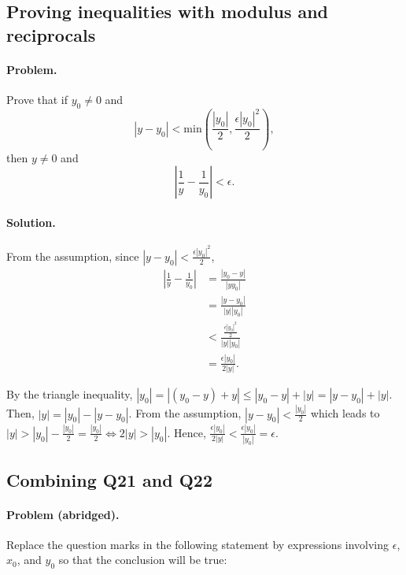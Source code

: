 \documentclass{article}
\begin{document}
\setcounter{subsection}{21}
\subsection{Proving inequalities with modulus and reciprocals}

\paragraph{Problem.} Prove that if $y_0 \neq 0$ and \begin{equation*}
  |y - y_0| < \mathrm{min}\left(\frac{|y_0|}{2}, \frac{\epsilon|y_0|^2}{2}\right),
\end{equation*} then $y \neq 0$ and \begin{equation*}
  \left|\frac{1}{y} - \frac{1}{y_0}\right| < \epsilon.
\end{equation*}

\paragraph{Solution.} From the assumption, since $|y - y_0| <
\frac{\epsilon|y_0|^2}{2}$, \begin{align*}
  \left|\frac{1}{y} - \frac{1}{y_0}\right| &= \frac{|y_0 - y|}{|yy_0|} \\
    &= \frac{|y - y_0|}{|y||y_0|} \\
    &< \frac{\frac{\epsilon|y_0|^2}{2}}{|y||y_0|} \\
    &= \frac{\epsilon|y_0|}{2|y|}.
\end{align*}

By the triangle inequality, $|y_0| = |(y_0 - y) + y| \leq |y_0 - y| + |y| = |y
- y_0| + |y|$. Then, $|y| = |y_0| - |y - y_0|$. From the assumption, $|y - y_0|
< \frac{|y_0|}{2}$ which leads to $|y| > |y_0| - \frac{|y_0|}{2} =
\frac{|y_0|}{2} \iff 2|y| > |y_0|$. Hence, $\frac{\epsilon|y_0|}{2|y|} <
\frac{\epsilon|y_0|}{|y_0|} = \epsilon$.

\setcounter{subsection}{22}
\subsection{Combining Q21 and Q22}

\paragraph{Problem (abridged).} Replace the question marks in the following
statement by expressions involving $\epsilon$, $x_0$, and $y_0$ so that the
conclusion will be true:
\end{document}
